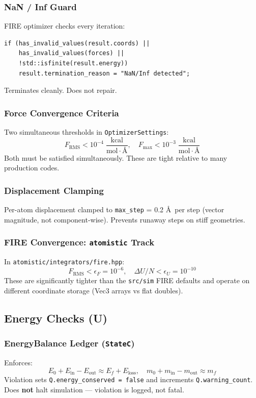 \documentclass[11pt,a4paper]{article}
\begin{document}
\subsubsection{NaN / Inf Guard}
FIRE optimizer checks every iteration:
\begin{lstlisting}
if (has_invalid_values(result.coords) ||
    has_invalid_values(forces) ||
    !std::isfinite(result.energy))
    result.termination_reason = "NaN/Inf detected";
\end{lstlisting}
Terminates cleanly. Does not repair.

\subsubsection{Force Convergence Criteria}
Two simultaneous thresholds in \texttt{OptimizerSettings}:
\[
F_{\mathrm{RMS}} < 10^{-4}\;\frac{\mathrm{kcal}}{\mathrm{mol}\cdot\text{\AA}}, \quad
F_{\mathrm{max}} < 10^{-3}\;\frac{\mathrm{kcal}}{\mathrm{mol}\cdot\text{\AA}}
\]
Both must be satisfied simultaneously. These are tight relative to many production codes.

\subsubsection{Displacement Clamping}
Per-atom displacement clamped to \texttt{max\_step} = 0.2 \AA\ per step (vector magnitude, not component-wise). Prevents runaway steps on stiff geometries.

\subsubsection{FIRE Convergence: \texttt{atomistic} Track}
In \texttt{atomistic/integrators/fire.hpp}:
\[
F_{\mathrm{RMS}} < \epsilon_F = 10^{-6}, \quad \Delta U/N < \epsilon_U = 10^{-10}
\]
These are significantly tighter than the \texttt{src/sim} FIRE defaults and operate on different coordinate storage (Vec3 arrays vs flat doubles).

\subsection{Energy Checks (U)}

\subsubsection{EnergyBalance Ledger (\texttt{StateC})}
Enforces:
\[
E_0 + E_{\mathrm{in}} - E_{\mathrm{out}} \approx E_f + E_{\mathrm{loss}}, \quad
m_0 + m_{\mathrm{in}} - m_{\mathrm{out}} \approx m_f
\]
Violation sets \texttt{Q.energy\_conserved = false} and increments \texttt{Q.warning\_count}.
Does \textbf{not} halt simulation --- violation is logged, not fatal.
\end{document}
